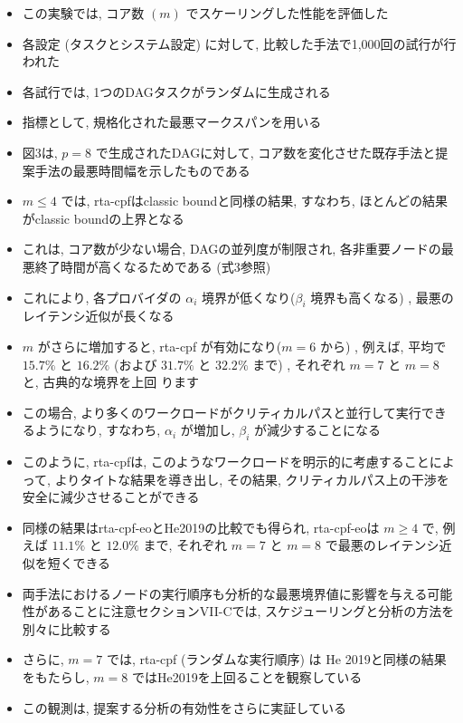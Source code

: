 \begin{frame}{}
    \begin{itemize}
        \item この実験では, コア数 $(m)$ でスケーリングした性能を評価した
\item 各設定 (タスクとシステム設定) に対して, 比較した手法で1,000回の試行が行われた
\item 各試行では, 1つのDAGタスクがランダムに生成される
\item 指標として, 規格化された最悪マークスパンを用いる
    \end{itemize}
\end{frame}

\begin{frame}{}
    \begin{itemize}
        \item 図3は, $p=8$ で生成されたDAGに対して, コア数を変化させた既存手法と提案手法の最悪時間幅を示したものである
\item $m \leq 4$ では, rta-cpfはclassic boundと同様の結果, すなわち, ほとんどの結果がclassic boundの上界となる
\item これは, コア数が少ない場合, DAGの並列度が制限され, 各非重要ノードの最悪終了時間が高くなるためである (式3参照) 
\item これにより, 各プロバイダの $\alpha_{i}$ 境界が低くなり($\beta_{i}$ 境界も高くなる) , 最悪のレイテンシ近似が長くなる
\item $m$ がさらに増加すると, rta-cpf が有効になり($m=6$ から) , 例えば, 平均で $15.7 \%$ と $16.2 \%$  (および $31.7 \%$ と $32.2 \%$ まで) , それぞれ $m=7$ と $m=8$ と, 古典的な境界を上回 ります
\item この場合, より多くのワークロードがクリティカルパスと並行して実行できるようになり, すなわち, $\alpha_{i}$ が増加し, $\beta_{i}$ が減少することになる
\item このように, rta-cpfは, このようなワークロードを明示的に考慮することによって, よりタイトな結果を導き出し, その結果, クリティカルパス上の干渉を安全に減少させることができる
    \end{itemize}
\end{frame}

\begin{frame}{}
    \begin{itemize}
        \item 同様の結果はrta-cpf-eoとHe2019の比較でも得られ, rta-cpf-eoは $m \geq 4$ で, 例えば $11.1 \%$ と $12.0 \%$ まで, それぞれ $m=7$ と $m=8$ で最悪のレイテンシ近似を短くできる
\item 両手法におけるノードの実行順序も分析的な最悪境界値に影響を与える可能性があることに注意セクションVII-Cでは, スケジューリングと分析の方法を別々に比較する
\item さらに, $m=7$ では, rta-cpf (ランダムな実行順序) は $\mathrm{He}$ 2019と同様の結果をもたらし, $m=8$ ではHe2019を上回ることを観察している
\item この観測は, 提案する分析の有効性をさらに実証している
    \end{itemize}
\end{frame}


